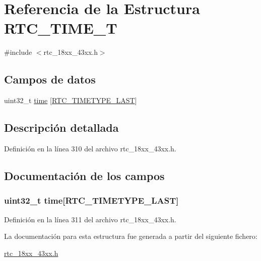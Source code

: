\hypertarget{struct_r_t_c___t_i_m_e___t}{}\section{Referencia de la Estructura R\+T\+C\+\_\+\+T\+I\+M\+E\+\_\+T}
\label{struct_r_t_c___t_i_m_e___t}


{\ttfamily \#include $<$rtc\+\_\+18xx\+\_\+43xx.\+h$>$}

\subsection*{Campos de datos}
\begin{DoxyCompactItemize}
\item 
uint32\+\_\+t \hyperlink{struct_r_t_c___t_i_m_e___t_a28d78767badf8442711dc9d1300f06a4}{time} \mbox{[}\hyperlink{group___r_t_c__18_x_x__43_x_x_gga8144898fe628404d396db06dc8aac0e0a0d4fafef57b6ef363f9a0875ff339cad}{R\+T\+C\+\_\+\+T\+I\+M\+E\+T\+Y\+P\+E\+\_\+\+L\+A\+ST}\mbox{]}
\end{DoxyCompactItemize}


\subsection{Descripción detallada}


Definición en la línea 310 del archivo rtc\+\_\+18xx\+\_\+43xx.\+h.



\subsection{Documentación de los campos}
\subsubsection[{\texorpdfstring{time}{time}}]{\setlength{\rightskip}{0pt plus 5cm}uint32\+\_\+t time\mbox{[}{\bf R\+T\+C\+\_\+\+T\+I\+M\+E\+T\+Y\+P\+E\+\_\+\+L\+A\+ST}\mbox{]}}\hypertarget{struct_r_t_c___t_i_m_e___t_a28d78767badf8442711dc9d1300f06a4}{}\label{struct_r_t_c___t_i_m_e___t_a28d78767badf8442711dc9d1300f06a4}


Definición en la línea 311 del archivo rtc\+\_\+18xx\+\_\+43xx.\+h.



La documentación para esta estructura fue generada a partir del siguiente fichero\+:\begin{DoxyCompactItemize}
\item 
\hyperlink{rtc__18xx__43xx_8h}{rtc\+\_\+18xx\+\_\+43xx.\+h}\end{DoxyCompactItemize}
